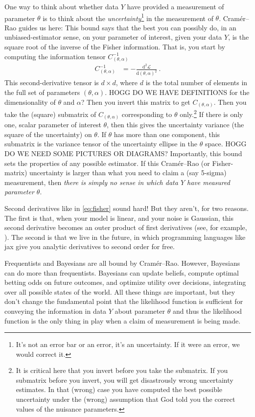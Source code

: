 \documentclass{article}
\newcommand{\dd}{\mathrm{d}}
\begin{document}
One way to think about whether data $Y$ have provided a measurement of parameter $\theta$ is to think about the \emph{uncertainty}\footnote{%
It's not an error bar or an error, it's an uncertainty. If it were an error, we would correct it.}
in the measurement of $\theta$.
Cram\'er--Rao guides us here:
This bound says that the best you can possibly do, in an unbiased-estimator sense, on your parameter of interest, given your data $Y$, is the square root of the inverse of the Fisher information.
That is, you start by computing the information tensor $C^{-1}_{(\theta,\alpha)}$
\begin{align}
    C^{-1}_{(\theta,\alpha)} &= - \frac{\dd^2\mathscr{L}}{\dd(\theta,\alpha)^2} ~.\label{eq:fisher}
\end{align}
This second-derivative tensor is $d\times d$, where $d$ is the total number of elements in the full set of parameters $(\theta,\alpha)$.
HOGG DO WE HAVE DEFINITIONS for the dimensionality of $\theta$ and $\alpha$?
Then you invert this matrix to get $C_{(\theta,\alpha)}$.
Then you take the (square) submatrix of $C_{(\theta,\alpha)}$ corresponding to $\theta$ only.\footnote{It is critical here that you invert before you take the submatrix. If you submatrix before you invert, you will get disastrously wrong uncertainty estimates. In that (wrong) case you have computed the best possible uncertainty under the (wrong) assumption that God told you the correct values of the nuisance parameters.}
If there is only one, scalar parameter of interest $\theta$, then this gives the uncertainty variance (the square of the uncertainty) on $\theta$.
If $\theta$ has more than one component, this submatrix is the variance tensor of the uncertainty ellipse in the $\theta$ space.
HOGG DO WE NEED SOME PICTURES OR DIAGRAMS?
Importantly, this bound sets the properties of any possible estimator.
If this Cram\'er--Rao (or Fisher-matrix) uncertainty is larger than what you need to claim a (say 5-sigma) measurement, then \emph{there is simply no sense in which data $Y$ have measured parameter $\theta$}.

Second derivatives like in \eqref{eq:fisher} sound hard!
But they aren't, for two reasons.
The first is that, when your model is linear, and your noise is Gaussian, this second derivative becomes an outer product of first derivatives (see, for example, \cite{fittingaline}).
The second is that we live in the future, in which programming languages like jax \cite{jax} give you analytic derivatives to second order for free.

Frequentists and Bayesians are all bound by Cram\'er--Rao.
However, Bayesians can do more than frequentists.
Bayesians can update beliefs, compute optimal betting odds on future outcomes, and optimize utility over decisions, integrating over all possible states of the world.
All these things are important, but they don't change the fundamental point that the likelihood function is sufficient for conveying the information in data $Y$ about parameter $\theta$ and thus the likelihood function is the only thing in play when a claim of measurement is being made.
\end{document}
